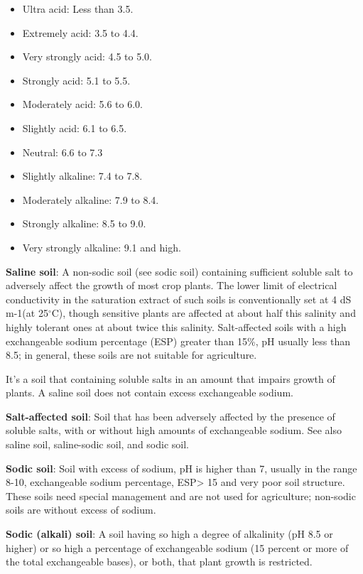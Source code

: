 \documentclass[
  10pt,
  b5paper,
]{book}
\providecommand{\tightlist}{%
  \setlength{\itemsep}{0pt}\setlength{\parskip}{0pt}}
\begin{document}
\begin{itemize}
\tightlist
\item
  Ultra acid: Less than 3.5.
\item
  Extremely acid: 3.5 to 4.4.
\item
  Very strongly acid: 4.5 to 5.0.
\item
  Strongly acid: 5.1 to 5.5.
\item
  Moderately acid: 5.6 to 6.0.
\item
  Slightly acid: 6.1 to 6.5.
\item
  Neutral: 6.6 to 7.3
\item
  Slightly alkaline: 7.4 to 7.8.
\item
  Moderately alkaline: 7.9 to 8.4.
\item
  Strongly alkaline: 8.5 to 9.0.
\item
  Very strongly alkaline: 9.1 and high.
\end{itemize}

\textbf{Saline soil}: A non-sodic soil (see sodic soil) containing sufficient soluble salt to adversely affect the growth of most crop plants. The lower limit of electrical conductivity in the saturation extract of such soils is conventionally set at 4 dS m-1(at 25\(^\circ\)C), though sensitive plants are affected at about half this salinity and highly tolerant ones at about twice this salinity. Salt-affected soils with a high exchangeable sodium percentage (ESP) greater than 15\%, pH usually less than 8.5; in general, these soils are not suitable for agriculture.

It's a soil that containing soluble salts in an amount that impairs growth of plants. A saline soil does not contain excess exchangeable sodium.

\textbf{Salt-affected soil}: Soil that has been adversely affected by the presence of soluble salts, with or without high amounts of exchangeable sodium. See also saline soil, saline-sodic soil, and sodic soil.

\textbf{Sodic soil}: Soil with excess of sodium, pH is higher than 7, usually in the range 8-10, exchangeable sodium percentage, ESP\textgreater{} 15 and very poor soil structure. These soils need special management and are not used for agriculture; non-sodic soils are without excess of sodium.

\textbf{Sodic (alkali) soil}: A soil having so high a degree of alkalinity (pH 8.5 or higher) or so high a percentage of exchangeable sodium (15 percent or more of the total exchangeable bases), or both, that plant growth is restricted.
\end{document}
